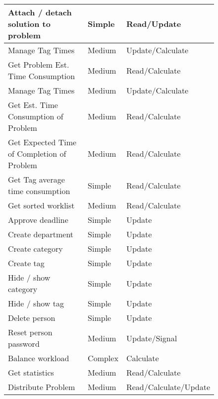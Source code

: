 \begin{figure}[hpt]
\begin{center}
\begin{tabular}{|l|l|l|}
Attach / detach solution to problem	&   Simple & Read/Update   \\ \hline%
Manage Tag Times &   Medium & Update/Calculate \\ \hline
Get Problem Est. Time Consumption 		&   Medium & Read/Calculate   \\ \hline%
Manage Tag Times &   Medium & Update/Calculate \\ \hline
Get  Est. Time Consumption of Problem					&   Medium & Read/Calculate   \\ \hline%
Get  Expected Time of Completion of Problem					&   Medium & Read/Calculate   \\ \hline%
Get Tag average time consumption					&   Simple & Read/Calculate   \\ \hline%
Get sorted worklist 								&   Medium & Read/Calculate   \\ \hline%
Approve deadline 						&   Simple & Update   \\ \hline%
Create department 					&   Simple & Update   \\ \hline%
Create category 						&   Simple & Update   \\ \hline%
Create tag									&   Simple & Update   \\ \hline%
Hide / show category				&   Simple & Update   \\ \hline%
Hide / show tag							&   Simple & Update   \\ \hline%
Delete person 							&   Simple & Update   \\ \hline%
Reset person password 			&   Medium & Update/Signal   \\ \hline%
Balance workload 						&   Complex & Calculate   \\ \hline%
Get statistics							&   Medium & Read/Calculate   \\ \hline%
Distribute Problem & Medium & Read/Calculate/Update \\ \hline%
\end{tabular}
\end{center}
\label{tab:functionlist}
\end{figure}

